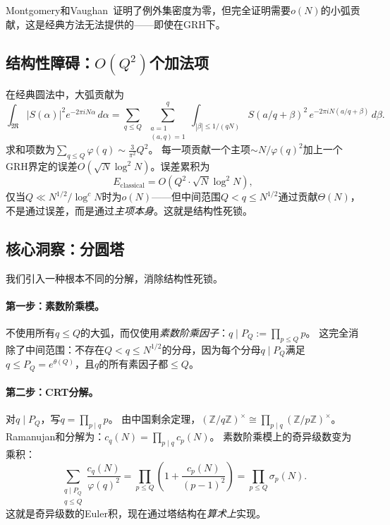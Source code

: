 \documentclass[11pt,a4paper]{article}
\theoremstyle{remark}
\newcommand{\Z}{\mathbb{Z}}
\begin{document}
Montgomery和Vaughan~\cite{MV1975}证明了例外集密度为零，但完全证明需要$o(N)$的小弧贡献，这是经典方法无法提供的——即使在GRH下。

\subsection{结构性障碍：$O(Q^2)$个加法项}

在经典圆法中，大弧贡献为
\begin{equation}
\label{eq:classical-decomp}
  \int_\mathfrak{M} |S(\alpha)|^2 e^{-2\pi i N\alpha}\,d\alpha
  = \sum_{q \leq Q}\;\sum_{\substack{a=1\\(a,q)=1}}^{q}
    \int_{|\beta|\leq 1/(qN)} S(a/q+\beta)^2\,e^{-2\pi i N(a/q+\beta)}\,d\beta.
\end{equation}
求和项数为$\sum_{q \leq Q}\varphi(q) \sim \frac{3}{\pi^2}Q^2$。
每一项贡献一个主项$\sim N/\varphi(q)^2$加上一个GRH界定的误差$O(\sqrt{N}\log^2 N)$。误差累积为
\begin{equation}
\label{eq:classical-accumulation}
  E_{\text{classical}} = O\!\left(Q^2 \cdot \sqrt{N}\log^2 N\right),
\end{equation}
仅当$Q \ll N^{1/2}/\log^c N$时为$o(N)$——但中间范围$Q < q \leq N^{1/2}$通过贡献$\Theta(N)$，不是通过误差，而是通过\emph{主项本身}。这就是结构性死锁。

\subsection{核心洞察：分圆塔}

我们引入一种根本不同的分解，消除结构性死锁。

\paragraph{第一步：素数阶乘模。}
不使用所有$q \leq Q$的大弧，而仅使用\emph{素数阶乘因子}：$q \mid P_Q := \prod_{p \leq Q} p$。
这完全消除了中间范围：不存在$Q < q \leq N^{1/2}$的分母，因为每个分母$q \mid P_Q$满足$q \leq P_Q = e^{\theta(Q)}$，且$q$的所有素因子都$\leq Q$。

\paragraph{第二步：CRT分解。}
对$q \mid P_Q$，写$q = \prod_{p \mid q} p$。
由中国剩余定理，$(\Z/q\Z)^\times \cong \prod_{p \mid q}(\Z/p\Z)^\times$。
Ramanujan和分解为：$c_q(N) = \prod_{p \mid q}c_p(N)$。
素数阶乘模上的奇异级数变为乘积：
\begin{equation}
\label{eq:tower-factorization}
  \sum_{\substack{q \mid P_Q \\ q \leq Q}}\frac{c_q(N)}{\varphi(q)^2}
  = \prod_{p \leq Q}\left(1 + \frac{c_p(N)}{(p-1)^2}\right)
  = \prod_{p \leq Q}\sigma_p(N).
\end{equation}
这就是奇异级数的Euler积，现在通过塔结构在\emph{算术上}实现。
\end{document}
